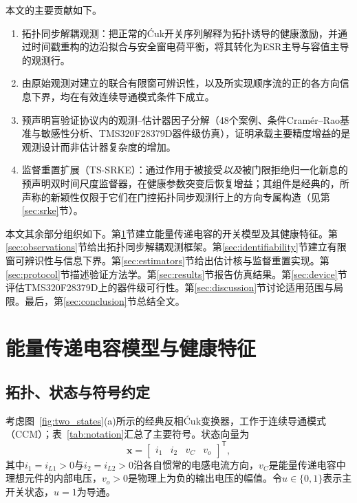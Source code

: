 \documentclass[zihao=5,a4paper]{ctexart}
\DeclareRobustCommand{\Cuk}{\mbox{\'{C}uk}}
\newcommand{\TSSRKE}{TS-SRKE}
\newcommand{\vect}[1]{\bm{#1}}
\begin{document}
本文的主要贡献如下。
\begin{enumerate}
\item 拓扑同步解耦观测：把正常的\Cuk{}开关序列解释为拓扑诱导的健康激励，并通过时间戳重构的边沿拟合与安全窗电荷平衡，将其转化为ESR主导与容值主导的观测行。
\item 由原始观测对建立的联合有限窗可辨识性，以及所实现顺序流的正的各方向信息下界，均在有效连续导通模式条件下成立。
\item 预声明盲验证协议内的观测--估计器因子分解（48个案例、条件Cram\'er--Rao基准与敏感性分析、TMS320F28379D器件级仿真），证明承载主要精度增益的是观测设计而非估计器复杂度的增加。
\item 监督重置扩展（\TSSRKE{}）：通过作用于被接受\emph{以及}被门限拒绝归一化新息的预声明双时间尺度监督器，在健康参数突变后恢复增益；其组件是经典的，所声称的新颖性仅限于它们在门控拓扑同步观测行上的方向专属构造（见第\ref{sec:srke}节）。
\end{enumerate}

本文其余部分组织如下。第\ref{sec:modeling}节建立能量传递电容的开关模型及其健康特征。第\ref{sec:observations}节给出拓扑同步解耦观测框架。第\ref{sec:identifiability}节建立有限窗可辨识性与信息下界。第\ref{sec:estimators}节给出估计核与监督重置实现。第\ref{sec:protocol}节描述验证方法学。第\ref{sec:results}节报告仿真结果。第\ref{sec:device}节评估TMS320F28379D上的器件级可行性。第\ref{sec:discussion}节讨论适用范围与局限。最后，第\ref{sec:conclusion}节总结全文。


\section{能量传递电容模型与健康特征}
\label{sec:modeling}

\subsection{拓扑、状态与符号约定}

考虑图~\ref{fig:two_states}(a)所示的经典反相\Cuk{}变换器，工作于连续导通模式（CCM）；表~\ref{tab:notation}汇总了主要符号。状态向量为
\begin{equation}
\vect{x}=\begin{bmatrix}i_1&i_2&v_C&v_o\end{bmatrix}^{\mathsf T},
\label{eq:state_vector}
\end{equation}
其中$i_1=i_{L1}>0$与$i_2=i_{L2}>0$沿各自惯常的电感电流方向，$v_C$是能量传递电容中理想元件的内部电压，$v_o>0$是物理上为负的输出电压的幅值。令$u\in\{0,1\}$表示主开关状态，$u=1$为导通。
\end{document}
